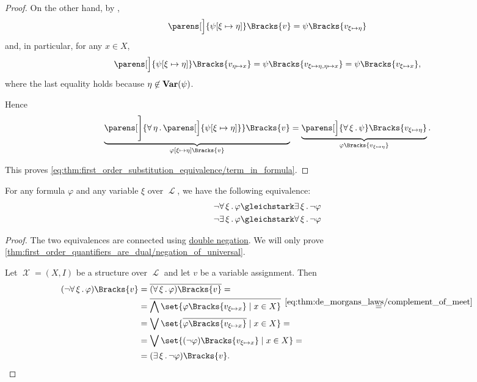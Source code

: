 \begin{proof}
  On the other hand, by ,
  \begin{equation*}
    \parens[\Big]{ \psi[\xi \mapsto \eta] }\Bracks{v} = \psi\Bracks{v_{\xi \mapsto \eta}}
  \end{equation*}
  and, in particular, for any \( x \in X \),
  \begin{equation*}
    \parens[\Big]{ \psi[\xi \mapsto \eta] }\Bracks{v_{\eta \mapsto x}}
    =
    \psi\Bracks{v_{\xi \mapsto \eta,\eta \mapsto x}}
    =
    \psi\Bracks{v_{\xi \mapsto x}},
  \end{equation*}
  where the last equality holds because \( \eta \not\in \operatorname{\mathbf{Var}}(\psi) \).

  Hence
  \begin{equation*}
    \underbrace{ \parens[\Bigg]{\qforall \eta \parens[\Big]{ \psi[\xi \mapsto \eta] } }\Bracks{v} }_{\varphi[\xi \mapsto \eta]\Bracks{v}}
    =
    \underbrace{ \parens[\Big]{\qforall \xi \psi }\Bracks{v_{\xi \mapsto \eta}} }_{\varphi\Bracks{v_{\xi \mapsto \eta}}}.
  \end{equation*}

  This proves \eqref{eq:thm:first_order_substitution_equivalence/term_in_formula}.
\end{proof}

\begin{proposition}\label{thm:first_order_quantifiers_are_dual}
  For any formula \( \varphi \) and any variable \( \xi \) over \( \mscrL \), we have the following equivalence:
  \begin{align}
    \neg \qforall \xi \varphi &\gleichstark \qexists \xi \neg \varphi \label{thm:first_order_quantifiers_are_dual/negation_of_universal} \\
    \neg \qexists \xi \varphi &\gleichstark \qforall \xi \neg \varphi \label{thm:first_order_quantifiers_are_dual/negation_of_existential}
  \end{align}
\end{proposition}
\begin{proof}
  The two equivalences are connected using \hyperref[thm:boolean_equivalences/double_negation]{double negation}. We will only prove \eqref{thm:first_order_quantifiers_are_dual/negation_of_universal}.

  Let \( \mscrX = (X, I) \) be a structure over \( \mscrL \) and let \( v \) be a variable assignment. Then
  \begin{align*}
    (\neg \qforall \xi \varphi)\Bracks{v}
    &=
    \overline{(\qforall \xi \varphi)\Bracks{v}}
    = \\ &=
    \overline{\bigwedge\set{ \varphi\Bracks{v_{\xi \mapsto x}} \given x \in X }}
    \reloset {\eqref{eq:thm:de_morgans_laws/complement_of_meet}} = \\ &=
    \bigvee\set{ \overline{\varphi\Bracks{v_{\xi \mapsto x}}} \given x \in X }
    = \\ &=
    \bigvee\set{ (\neg \varphi)\Bracks{v_{\xi \mapsto x}} \given x \in X }
    = \\ &=
    (\qexists \xi \neg \varphi)\Bracks{v}.
  \end{align*}
\end{proof}

